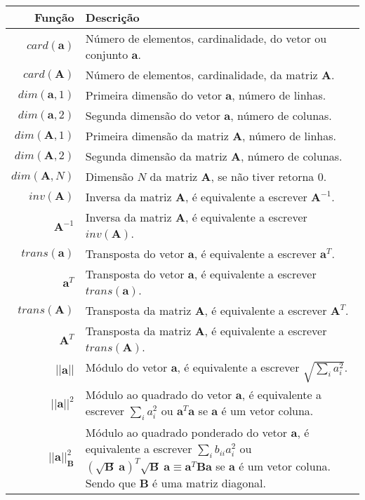 \begin{tabular}{r | p{.70\linewidth} }
\hline	
Função & Descrição \\ \hline
$card(\mathbf{a})$ & Número de elementos, cardinalidade, do vetor ou conjunto $\mathbf{a}$. \\
$card(\mathbf{A})$ & Número de elementos, cardinalidade, da matriz $\mathbf{A}$. \\
\hline
$dim(\mathbf{a},1)$ & Primeira dimensão do vetor $\mathbf{a}$, número de linhas. \\
$dim(\mathbf{a},2)$ & Segunda dimensão do vetor $\mathbf{a}$, número de colunas. \\
$dim(\mathbf{A},1)$ & Primeira dimensão da matriz $\mathbf{A}$, número de linhas. \\
$dim(\mathbf{A},2)$ & Segunda dimensão da matriz $\mathbf{A}$, número de colunas. \\
$dim(\mathbf{A},N)$ & Dimensão $N$ da matriz $\mathbf{A}$, se não tiver retorna $0$. \\
\hline
$inv(\mathbf{A})$ & Inversa da matriz $\mathbf{A}$, é equivalente a escrever $\mathbf{A}^{-1}$. \\
$\mathbf{A}^{-1}$ & Inversa da matriz $\mathbf{A}$, é equivalente a escrever $inv(\mathbf{A})$. \\
\hline
$trans(\mathbf{a})$ & Transposta do vetor $\mathbf{a}$, é equivalente a escrever $\mathbf{a}^{T}$. \\
$\mathbf{a}^{T}$ & Transposta do vetor $\mathbf{a}$, é equivalente a escrever $trans(\mathbf{a})$. \\
$trans(\mathbf{A})$ & Transposta da matriz $\mathbf{A}$, é equivalente a escrever $\mathbf{A}^{T}$. \\
$\mathbf{A}^{T}$ & Transposta da matriz $\mathbf{A}$, é equivalente a escrever $trans(\mathbf{A})$. \\
\hline
$||\mathbf{a}||$ & Módulo do vetor $\mathbf{a}$, é equivalente a escrever $\sqrt{\sum_i a_i^2}$. \\
$||\mathbf{a}||^2$ & Módulo ao quadrado do vetor $\mathbf{a}$, 
é equivalente a escrever $\sum_i a_i^2$ ou $\mathbf{a}^{T}\mathbf{a}$ se $\mathbf{a}$ é um vetor coluna. \\
$||\mathbf{a}||_{\mathbf{B}}^2$ & Módulo ao quadrado ponderado do vetor $\mathbf{a}$, 
é equivalente a escrever $\sum_i b_{ii} a_i^2$ ou $(\sqrt{\mathbf{B}}~\mathbf{a})^{T}\sqrt{\mathbf{B}}~\mathbf{a} \equiv \mathbf{a}^{T}\mathbf{B}\mathbf{a}$ 
se $\mathbf{a}$ é um vetor coluna. Sendo que $\mathbf{B}$ é uma matriz diagonal.\\
\end{tabular}

\onehalfspacing
